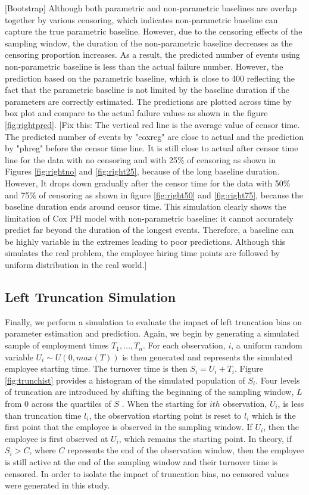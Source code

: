\documentclass[12pt,letterpaper]{article}
\begin{document}
[Bootstrap]
Although both parametric and non-parametric baselines are overlap together by various censoring, which indicates non-parametric baseline can capture the true parametric baseline. However, due to the censoring effects of the sampling window, the duration of the non-parametric baseline decreases as the censoring proportion increases. As a result, the predicted number of events using non-parametric baseline is less than the actual failure number. However, the prediction based on the parametric baseline, which is close to 400 reflecting the fact that the parametric baseline is not limited by the baseline duration if the parameters are correctly estimated. The predictions are plotted across time by box plot and compare to the actual failure values as shown in the figure \ref{fig:rightpred}.  [Fix this: The vertical red line is the average value of censor time. The predicted number of events by "coxreg" are close to actual and the prediction by "phreg" before the censor time line. It is still close to actual after censor time line for the data with no censoring and with 25\% of censoring as shown in Figures \ref{fig:rightno} and \ref{fig:right25}, because of the long baseline duration. However, It drops down gradually after the censor time for the data with 50\% and 75\% of censoring as shown in figure \ref{fig:right50} and \ref{fig:right75}, because the baseline duration ends around censor time. This simulation clearly shows the limitation of Cox PH model with non-parametric baseline: it cannot accurately predict far beyond the duration of the longest events. Therefore, a baseline can be highly variable in the extremes leading to poor predictions. Although this simulates the real problem, the employee hiring time points are followed by uniform distribution in the real world.]

\subsection{Left Truncation Simulation}

Finally, we perform a simulation to evaluate the impact of left truncation bias on parameter estimation and prediction. Again, we begin by generating a simulated sample of employment times $T_1, \ldots, T_n$.  For each observation, $i$, a uniform random variable $U_i \sim U(0,max(T))$ is then generated and represents the simulated employee starting time. The turnover time is then $S_i = U_i+T_i$. Figure \ref{fig:trunchist} provides a histogram of the simulated population of $S_i$. Four levels of truncation are introduced by shifting the beginning of the sampling window, $L$ from 0 across the quartiles of $S$ . When the starting for $ith$ observation, $U_i$, is less than truncation time $l_i$, the observation starting point is reset to $l_i$ which is the first point that the employee is observed in the sampling window. If $U_i$, then the employee is first observed at $U_i$, which remains the starting point.  In theory, if $S_i>C$, where $C$ represents the end of the observation window, then the employee is still active at the end of the sampling window and their turnover time is censored.  In order to isolate the impact of truncation bias, no censored values were generated in this study.
\end{document}
